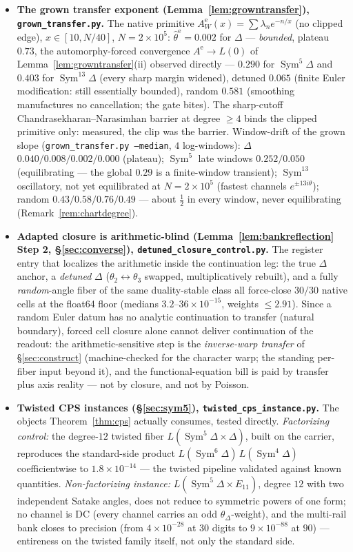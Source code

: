 \documentclass[11pt]{article}
\theoremstyle{definition}
\newcommand{\Sym}{\operatorname{Sym}}
\begin{document}
\begin{itemize}
\item \textbf{The grown transfer exponent (Lemma~\ref{lem:growntransfer}), \texttt{grown\_transfer.py}.}
The native primitive $A^{\mathrm e}_W(x)=\sum\lambda_n e^{-n/x}$ (no clipped edge), $x\in[10,N/40]$,
$N=2\times10^{5}$: $\hat\theta^{\mathrm e}=0.002$ for $\Delta$ --- \emph{bounded}, plateau $0.73$, the
automorphy-forced convergence $A^{\mathrm e}\to L(0)$ of Lemma~\ref{lem:growntransfer}(ii) observed directly
--- $0.290$ for $\Sym^5\Delta$ and $0.403$ for $\Sym^{13}\Delta$ (every sharp margin widened), detuned
$0.065$ (finite Euler modification: still essentially bounded), random $0.581$ (smoothing manufactures no
cancellation; the gate bites). The sharp-cutoff Chandrasekharan--Narasimhan barrier at degree $\ge4$ binds
the clipped primitive only: measured, the clip was the barrier. Window-drift of the grown slope
(\texttt{grown\_transfer.py --median}, $4$ log-windows): $\Delta$ $0.040/0.008/0.002/0.000$ (plateau);
$\Sym^5$ late windows $0.252/0.050$ (equilibrating --- the global $0.29$ is a finite-window transient);
$\Sym^{13}$ oscillatory, not yet equilibrated at $N=2\times10^{5}$ (fastest channels $e^{\pm13i\theta}$);
random $0.43/0.58/0.76/0.49$ --- about $\tfrac12$ in every window, never equilibrating
(Remark~\ref{rem:chartdegree}).

\item \textbf{Adapted closure is arithmetic-blind (Lemma~\ref{lem:bankreflection} Step 2,
\S\ref{sec:converse}), \texttt{detuned\_closure\_control.py}.} The register entry that localizes the
arithmetic inside the continuation leg: the true $\Delta$ anchor, a \emph{detuned} $\Delta$
($\theta_2\leftrightarrow\theta_3$ swapped, multiplicatively rebuilt), and a fully \emph{random}-angle fiber
of the same duality-stable class all force-close $30/30$ native cells at the float64 floor (medians
$3.2$--$36\times10^{-15}$, weights $\le2.91$). Since a random Euler datum has no analytic continuation to
transfer (natural boundary), forced cell closure alone cannot deliver continuation of the readout: the
arithmetic-sensitive step is the \emph{inverse-warp transfer} of \S\ref{sec:construct} (machine-checked for
the character warp; the standing per-fiber input beyond it), and the functional-equation bill is paid by
transfer plus axis reality --- not by closure, and not by Poisson.

\item \textbf{Twisted CPS instances (\S\ref{sec:sym5}), \texttt{twisted\_cps\_instance.py}.} The objects
Theorem~\ref{thm:cps} actually consumes, tested directly. \emph{Factorizing control:} the degree-$12$ twisted
fiber $L(\Sym^5\Delta\times\Delta)$, built on the carrier, reproduces the standard-side product
$L(\Sym^6\Delta)\,L(\Sym^4\Delta)$ coefficientwise to $1.8\times10^{-14}$ --- the twisted pipeline validated
against known quantities. \emph{Non-factorizing instance:} $L(\Sym^5\Delta\times E_{11})$, degree $12$ with two
independent Satake angles, does not reduce to symmetric powers of one form; no channel is DC (every channel
carries an odd $\theta_\Delta$-weight), and the multi-rail bank closes to precision (from $4\times10^{-28}$ at
$30$ digits to $9\times10^{-88}$ at $90$) --- entireness on the twisted family itself, not only the standard side.


\end{itemize}
\end{document}
